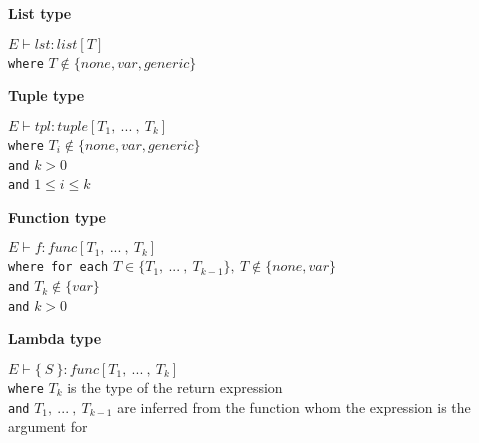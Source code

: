 \textbf{List type}\\
\begin{center}
	\begin{math}
	E \vdash lst : list[T]
	\end{math}
	\\[1\baselineskip]
	\texttt{where} $T \notin \{none, var, generic\}$
\end{center}

\textbf{Tuple type}\\
\begin{center}
	\begin{math}
	E \vdash tpl : tuple[T_1, \ .
	.
	.
	\ ,\ T_k]
	\end{math}
	\\[1\baselineskip]
	\texttt{where} $T_i \notin \{none, var, generic\}$\\
	\texttt{and} $k > 0$\\
	\texttt{and} $1 \le i \le k$
\end{center}

\textbf{Function type}\\
\begin{center}
	\begin{math}
	E \vdash f : func[T_1,\ .
	.
	.
	\ ,\ T_k]
	\end{math}
	\\[1\baselineskip]
	\texttt{where for each} $T \in \{T_1,\ .
	.
	.
	\ ,\ T_{k-1}\},\ T \notin \{none, var\}$\\
	\texttt{and} $T_k \notin \{var\}$\\
	\texttt{and} $k > 0$
\end{center}

\textbf{Lambda type}\\
\begin{center}
	\begin{math}
	E \vdash \{\ S\ \} : func[T_1,\ .
	.
	.
	\ ,\ T_k]
	\end{math}
	\\[1\baselineskip]
	\texttt{where} $T_k$ is the type of the return expression\\
	\texttt{and} $T_1, \ .
	.
	.
	\ ,\ T_{k-1}$ are inferred from the function whom the expression is the argument for%
\end{center}

